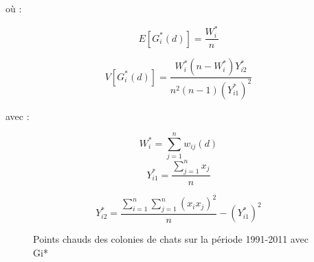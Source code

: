 \medskip

où :

\medskip

\begin{equation}
    E[G_i^*(d)] = \frac{W_i^*}{n}
\end{equation}

\begin{equation}
    V[G_i^*(d)] = \frac{W_i^*(n - W_i^*)Y_{i2}^*}{n^2(n - 1) (Y_{i1}^*)^2}
\end{equation}

\medskip
avec :

\medskip
\begin{equation}
    W_i^* = \sum_{j=1}^n w_{ij}(d)
\end{equation}
\begin{equation}
    Y_{i1}^* = \frac{\sum_{j=1}^n x_j}{n}
\end{equation}

\begin{equation}
    Y_{i2}^* = \frac{\sum_{i=1}^n \sum_{j=1}^n (x_i x_j)^2}{n} - (Y_{i1}^*)^2
\end{equation}

\medskip

\begin{figure}[hbt!]
  \centering
  \caption{Points chauds des colonies de chats sur la période 1991-2011 avec Gi* \parencite{aguilar_distribution_2013}}
  \label{fig:gi-result}
\end{figure}
\FloatBarrier

\medskip


